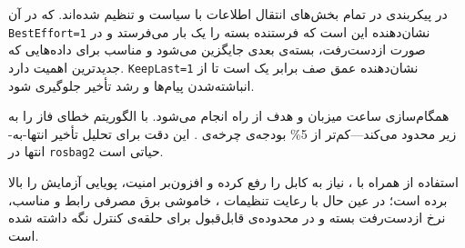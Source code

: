 در پیکربندی  در  
تمام بخش‌های انتقال اطلاعات
با سیاست
و
  تنظیم شده‌اند. که در آن \texttt{BestEffort=1}
  نشان‌دهنده این است که
	 فرستنده بسته را یک بار می‌فرستد و در صورت ازدست‌رفت، بسته‌ی بعدی جایگزین می‌شود و مناسب برای داده‌هایی که جدیدترین اهمیت دارد.
	\texttt{KeepLast=1} نشان‌دهنده عمق صف برابر یک است تا از انباشته‌شدن پیام‌ها و رشد تأخیر جلوگیری شود.



همگام‌سازی ساعت میزبان و هدف از راه  انجام می‌شود.  با الگوریتم  خطای فاز را به زیر
  محدود می‌کند—کم‌تر از 5\% بودجه‌ی چرخه‌ی 
  . 
  این دقت برای تحلیل تأخیر انتها-به-انتها در \texttt{rosbag2} حیاتی است.

استفاده از  همراه با ، نیاز به کابل را رفع کرده و افزون‌بر امنیت، پویایی آزمایش را بالا برده است؛ در عین حال با رعایت تنظیمات ، خاموشی برق مصرفی رابط و  مناسب، نرخ از‌دست‌رفت بسته و  در محدوده‌ی قابل‌قبول برای حلقه‌ی کنترل
  نگه داشته شده است.
	
	
	

